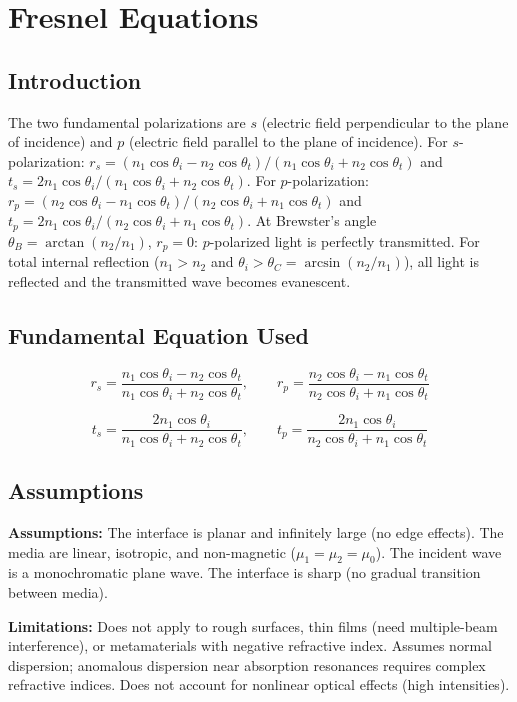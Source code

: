 \chapter{Fresnel Equations}

\section*{Introduction}

The two fundamental polarizations are $s$ (electric field perpendicular to the plane of incidence) and $p$ (electric field parallel to the plane of incidence). For $s$-polarization: $r_s = (n_1\cos\theta_i - n_2\cos\theta_t)/(n_1\cos\theta_i + n_2\cos\theta_t)$ and $t_s = 2n_1\cos\theta_i/(n_1\cos\theta_i + n_2\cos\theta_t)$. For $p$-polarization: $r_p = (n_2\cos\theta_i - n_1\cos\theta_t)/(n_2\cos\theta_i + n_1\cos\theta_t)$ and $t_p = 2n_1\cos\theta_i/(n_2\cos\theta_i + n_1\cos\theta_t)$. At Brewster's angle $\theta_B = \arctan(n_2/n_1)$, $r_p = 0$: $p$-polarized light is perfectly transmitted. For total internal reflection ($n_1 > n_2$ and $\theta_i > \theta_C = \arcsin(n_2/n_1)$), all light is reflected and the transmitted wave becomes evanescent.
\section*{Fundamental Equation Used}

\[
r_s = \frac{n_1\cos\theta_i - n_2\cos\theta_t}{n_1\cos\theta_i + n_2\cos\theta_t},\qquad r_p = \frac{n_2\cos\theta_i - n_1\cos\theta_t}{n_2\cos\theta_i + n_1\cos\theta_t}
\]

\[
t_s = \frac{2n_1\cos\theta_i}{n_1\cos\theta_i + n_2\cos\theta_t},\qquad t_p = \frac{2n_1\cos\theta_i}{n_2\cos\theta_i + n_1\cos\theta_t}
\]
\section*{Assumptions}

\textbf{Assumptions:} The interface is planar and infinitely large (no edge effects). The media are linear, isotropic, and non-magnetic ($\mu_1 = \mu_2 = \mu_0$). The incident wave is a monochromatic plane wave. The interface is sharp (no gradual transition between media).


\textbf{Limitations:} Does not apply to rough surfaces, thin films (need multiple-beam interference), or metamaterials with negative refractive index. Assumes normal dispersion; anomalous dispersion near absorption resonances requires complex refractive indices. Does not account for nonlinear optical effects (high intensities).


